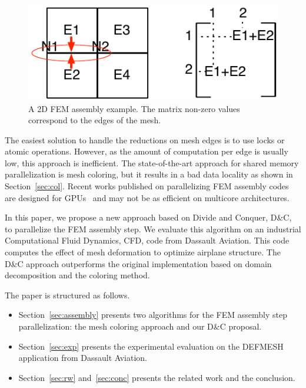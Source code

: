 \documentclass[10pt]{IOS-Book-Article}
\begin{document}
\begin{figure}[tp]
 \includegraphics[scale=0.6]{FEM_ass.pdf}
 \caption{A 2D FEM assembly example. The matrix non-zero values correspond to the edges of the mesh.}
 \label{fig:2Dasm}
\end{figure}

The easiest solution to handle the reductions on mesh edges is to use locks or atomic operations.
However, as the amount of computation per edge is usually low, this approach is inefficient.
The state-of-the-art approach for shared memory parallelization is mesh coloring, but it results in a bad data locality as shown in Section~\ref{sec:col}.
Recent works published on parallelizing FEM assembly codes are designed for GPUs~\cite{cecka2011assembly,CPUGPUasm}
and may not be as efficient on multicore architectures.

In this paper, we propose a new approach based on Divide and Conquer, D\&C, to parallelize the FEM assembly step.
We evaluate this algorithm on an industrial Computational Fluid Dynamics, CFD, code from Dassault Aviation.
This code computes the effect of mesh deformation to optimize airplane structure.
The D\&C approach outperforms the original implementation based on domain decomposition and the coloring method.

The paper is structured as follows.
\begin{itemize}
\item Section~\ref{sec:assembly} presents  two algorithms for the FEM assembly step parallelization: the mesh coloring approach and our D\&C proposal.
\item Section~\ref{sec:exp} presents the experimental evaluation on the DEFMESH application from Dassault Aviation.
\item Section~\ref{sec:rw} and~\ref{sec:conc} presents the related work and the conclusion.
\end{itemize}

\end{document}
